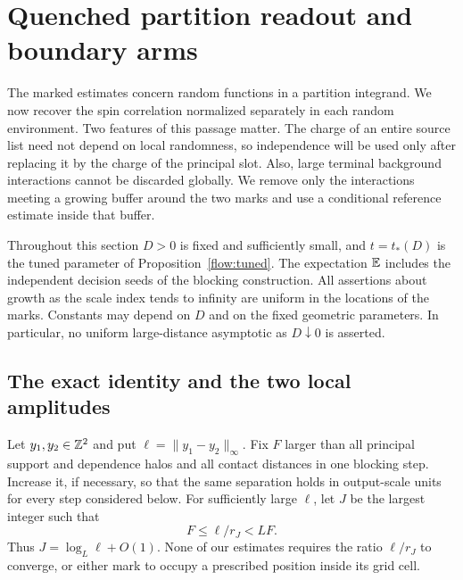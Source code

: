\section{Quenched partition readout and boundary arms}
\label{sec:readout}

The marked estimates concern random functions in a partition integrand.
We now recover the spin correlation normalized separately in each
random environment.  Two features of this passage matter.  The charge of
an entire source list need not depend on local randomness, so independence
will be used only after replacing it by the charge of the principal
slot.  Also, large terminal background interactions cannot be discarded
globally.  We remove only the interactions meeting a growing buffer
around the two marks and use a conditional reference estimate inside
that buffer.

Throughout this section $D>0$ is fixed and sufficiently small, and
$t=t_*(D)$ is the tuned parameter of Proposition~\ref{flow:tuned}.
The expectation $\mathbb E$ includes the independent decision seeds of the
blocking construction.  All assertions about growth as the scale index
tends to infinity are uniform in the locations of the marks.  Constants
may depend on $D$ and on the fixed geometric parameters.  In particular,
no uniform large-distance asymptotic as $D\downarrow0$ is asserted.

\subsection{The exact identity and the two local amplitudes}

Let $y_1,y_2\in\mathbb Z^2$ and put
$\ell=\lVert y_1-y_2\rVert_\infty$.  Fix $F$ larger than all principal
support and dependence halos and all contact distances in one blocking
step.  Increase it, if necessary, so that the same separation holds in
output-scale units for every step considered below.  For sufficiently
large $\ell$, let $J$ be the largest integer such that
\begin{equation}
 F\le \ell/r_J<LF.
 \label{read:stop}
\end{equation}
Thus $J=\log_L\ell+O(1)$.  None of our estimates requires the ratio
$\ell/r_J$ to converge, or either mark to occupy a prescribed position
inside its grid cell.

